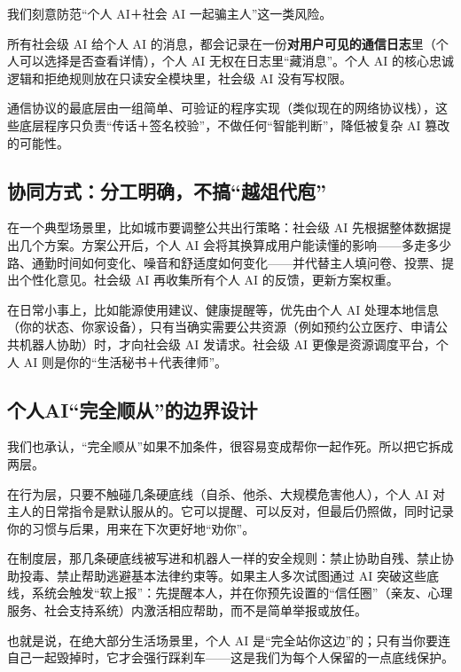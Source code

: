 我们刻意防范``个人 AI＋社会 AI 一起骗主人''这一类风险。

所有社会级 AI 给个人 AI 的消息，都会记录在一份\textbf{对用户可见的通信日志}里（个人可以选择是否查看详情），个人 AI 无权在日志里``藏消息''。个人 AI 的核心忠诚逻辑和拒绝规则放在只读安全模块里，社会级 AI 没有写权限。

通信协议的最底层由一组简单、可验证的程序实现（类似现在的网络协议栈），这些底层程序只负责``传话＋签名校验''，不做任何``智能判断''，降低被复杂 AI 篡改的可能性。

\subsection{协同方式：分工明确，不搞``越俎代庖''}\label{ux534fux540cux65b9ux5f0fux5206ux5de5ux660eux786eux4e0dux641eux8d8aux4fceux4ee3ux5e96}

在一个典型场景里，比如城市要调整公共出行策略：社会级 AI 先根据整体数据提出几个方案。方案公开后，个人 AI 会将其换算成用户能读懂的影响------多走多少路、通勤时间如何变化、噪音和舒适度如何变化------并代替主人填问卷、投票、提出个性化意见。社会级 AI 再收集所有个人 AI 的反馈，更新方案权重。

在日常小事上，比如能源使用建议、健康提醒等，优先由个人 AI 处理本地信息（你的状态、你家设备），只有当确实需要公共资源（例如预约公立医疗、申请公共机器人协助）时，才向社会级 AI 发请求。社会级 AI 更像是资源调度平台，个人 AI 则是你的``生活秘书＋代表律师''。

\subsection{个人AI``完全顺从''的边界设计}\label{ux4e2aux4ebaaiux5b8cux5168ux987aux4eceux7684ux8fb9ux754cux8bbeux8ba1}

我们也承认，``完全顺从''如果不加条件，很容易变成帮你一起作死。所以把它拆成两层。

在行为层，只要不触碰几条硬底线（自杀、他杀、大规模危害他人），个人 AI 对主人的日常指令是默认服从的。它可以提醒、可以反对，但最后仍照做，同时记录你的习惯与后果，用来在下次更好地``劝你''。

在制度层，那几条硬底线被写进和机器人一样的安全规则：禁止协助自残、禁止协助投毒、禁止帮助逃避基本法律约束等。如果主人多次试图通过 AI 突破这些底线，系统会触发``软上报''：先提醒本人，并在你预先设置的``信任圈''（亲友、心理服务、社会支持系统）内激活相应帮助，而不是简单举报或放任。

也就是说，在绝大部分生活场景里，个人 AI 是``完全站你这边''的；只有当你要连自己一起毁掉时，它才会强行踩刹车------这是我们为每个人保留的一点底线保护。

